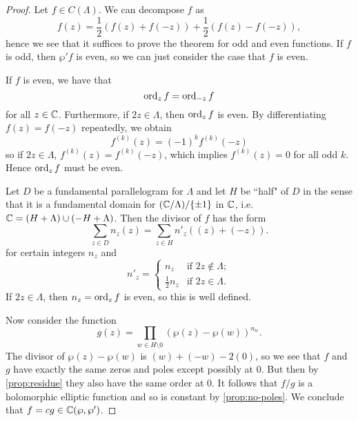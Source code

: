 \begin{proof}
	Let $f \in C(\Lambda)$. We can decompose $f$ as
	\begin{equation*}
		f(z) = \frac{1}{2}(f(z) + f (-z)) + \frac{1}{2}(f(z) - f(-z)),
	\end{equation*}
	hence we see that it suffices to prove the theorem for odd and even
	functions. If $f$ is odd, then $\wp'f$ is even, so we can just consider
	the case that $f$ is even.

	If $f$ is even, we have that
	\begin{equation*}
		\operatorname{ord}_z f = \operatorname{ord}_{-z} f
	\end{equation*}
	for all $z\in \mathbb{C}$. Furthermore, if $2z \in \Lambda$, then
	$\operatorname{ord}_z f$ is even. By differentiating $f(z) = f(-z)$ repeatedly,
	we obtain
	\begin{equation*}
		f^{(k)}(z) = (-1)^kf^{(k)}(-z)
	\end{equation*}
	so if $2z \in \Lambda$, $f^{(k)}(z) = f^{(k)}(-z)$, which implies
	$f^{(k)}(z) = 0$ for all odd $k$. Hence $\operatorname{ord}_z f$ must be even.

	Let $D$ be a fundamental parallelogram for $\Lambda$ and let $H$ 
	be ``half" of $D$ in the sense that it is a fundamental domain for $(\mathbb{C}/\Lambda)/\{\pm 1\}$ in $\mathbb{C}$,
	i.e. $\mathbb{C} = (H + \Lambda) \cup (-H + \Lambda)$.
	Then the divisor of $f$ has the form
	\begin{equation*}
		\sum_{z \in D} n_z(z) = \sum_{z \in H} n'_z((z) + (-z)).
	\end{equation*}
	for certain integers $n_z$ and
	\begin{equation*}
		n'_z =
		\begin{cases}
			n_z &\textrm{if } 2z \notin \Lambda;\\
			\frac{1}{2}n_z &\textrm{if } 2z \in \Lambda.
		\end{cases}
	\end{equation*}
	If $2z \in \Lambda$, then
	$n_z = \operatorname{ord}_z f$ is even, so this is well defined.

	Now consider the function
	\begin{equation*}
		g(z) = \prod_{w \in H\setminus 0}(\wp(z) - \wp(w))^{n_w}.
	\end{equation*}
	The divisor of $\wp(z) - \wp(w)$ is $(w) + (-w) - 2(0)$, so we see that
	$f$ and $g$ have exactly the same zeros and poles except possibly at
	$0$. But then by \ref{prop:residue} they also have the same order at $0$.
	It follows that $f/g$ is a holomorphic elliptic function and so is constant
	by \ref{prop:no-poles}.
	We conclude that $f = cg \in \mathbb{C}(\wp, \wp')$.
\end{proof}

